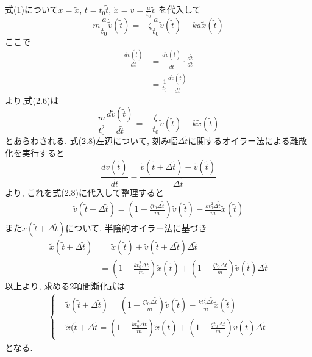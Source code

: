 \documentclass[a4paper]{jarticle}
\begin{document}
\subsection{}
\noindent
式(1)について$x = \tilde{x}$, $t = t_0 \tilde{t}$, $\dot{x} = v = \frac{a}{t_0} \tilde{v}$
を代入して
\begin{equation}
    m \frac{a}{t_0} \dot{\tilde{v}}(\tilde{t}) = -\zeta \frac{a}{t_0} \tilde{v}(\tilde{t})
    -k a \tilde{x}(\tilde{t}) \tag{2.6}
\end{equation}
ここで
\begin{align*}
    \frac{d \tilde{v}(\tilde{t})}{dt} &= \frac{d \tilde{v}(\tilde{t})}{d \tilde{t}} \cdot \frac{d \tilde{t}}{dt} \\
    &= \frac{1}{t_0} \frac{d \tilde{v}(\tilde{t})}{d \tilde{t}} \tag{2.7}
\end{align*}
より,式(2.6)は
\begin{equation}
    \frac{m}{t_0^2} \frac{d \tilde{v}(\tilde{t})}{d \tilde{t}} = - \frac{\zeta}{t_0} \tilde{v}(\tilde{t})
    -k \tilde{x}(\tilde{t}) \tag{2.8}
\end{equation}
とあらわされる. 式(2.8)左辺について, 刻み幅$\Delta \tilde{t}$に関するオイラー法による離散化を実行すると
\begin{equation}
    \frac{d \tilde{v}(\tilde{t})}{d \tilde{t}} = \frac{\tilde{v}(\tilde{t} + \Delta \tilde{t}) - \tilde{v}(\tilde{t})}{\Delta \tilde{t}} 
    \tag {2.9}
\end{equation}
より, これを式(2.8)に代入して整理すると
\begin{align}
    \tilde{v}(\tilde{t} + \Delta \tilde{t}) = \left(1 - \frac{\zeta t_0 \Delta \tilde{t}}{m}\right) \tilde{v}(\tilde{t})
    - \frac{k t_0^2 \Delta \tilde{t}}{m} \tilde{x}(\tilde{t}) \tag{2.10}
\end{align}
また$\tilde{x}(\tilde{t} + \Delta \tilde{t})$について, 半陰的オイラー法に基づき
\begin{align*}
    \tilde{x}(\tilde{t} + \Delta \tilde{t}) &= \tilde{x}(\tilde{t}) + \tilde{v}(\tilde{t} + \Delta \tilde{t}) \Delta \tilde{t} \\
    &= \left(1 - \frac{k t_0^2 \Delta \tilde{t}}{m}\right) \tilde{x}(\tilde{t}) 
    + \left(1 - \frac{\zeta t_0 \Delta \tilde{t}}{m}\right) \tilde{v}(\tilde{t}) \Delta \tilde{t} \tag{2.11}
\end{align*}
以上より, 求める2項間漸化式は
\begin{subequations}
    \begin{align}    %
    \left\{
        \begin{aligned}
        & \tilde{v}(\tilde{t} + \Delta \tilde{t}) = \left(1 - \frac{\zeta t_0 \Delta \tilde{t}}{m}\right) \tilde{v}(\tilde{t})
        - \frac{k t_0^2 \Delta \tilde{t}}{m} \tilde{x}(\tilde{t})\\
        & \tilde{x}(\tilde{t} + \Delta \tilde{t} = \left(1 - \frac{k t_0^2 \Delta \tilde{t}}{m}\right) \tilde{x}(\tilde{t}) 
        + \left(1 - \frac{\zeta t_0 \Delta \tilde{t}}{m}\right) \tilde{v}(\tilde{t}) \Delta \tilde{t}
        \end{aligned}
    \right. \tag{2.12}
    \end{align}
\end{subequations}
となる.
\end{document}
